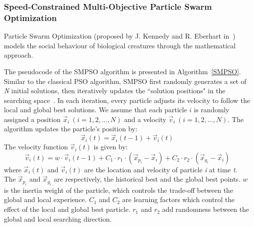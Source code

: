 \documentclass[10pt,journal,compsoc]{IEEEtran}
\begin{document}
\subsubsection{Speed-Constrained Multi-Objective Particle Swarm Optimization}
Particle Swarm Optimization (proposed by J. Kennedy and R. Eberhart in~\cite{poli2017}) models the social behaviour of biological creatures through the mathematical approach.

The pseudocode of the SMPSO algorithm is presented in Algorithm~\ref{SMPSO}. %
Similar to the classical PSO algorithm, SMPSO first randomly generates a set of \textit{N} initial solutions, then iteratively updates the ``solution positions" in the searching space~\cite{smpso}.
In each iteration, every particle adjusts its velocity to follow the local and global best solutions. We assume that each particle $i$ is randomly assigned a position $\vec{x}_i\ (i=1, 2, ..., N)$ and a velocity $\vec{v}_i\ (i=1,2,...,N)$. The algorithm updates the particle's position by:
\begin{equation}\label{psoposition}
\vec{x}_i(t) = \vec{x}_i(t-1) + \vec{v}_i(t)
\end{equation}
The velocity function $\vec{v}_i(t)$ is given by:
\begin{equation}\label{psospeed}
\vec{v}_i(t) = w \cdot \vec{v}_i(t-1) + C_1 \cdot r_1 \cdot (\vec{x}_{p_i}- \vec{x}_i)+ C_2 \cdot r_2 \cdot (\vec{x}_{g_i} - \vec{x}_i)
\end{equation}
where $\vec{x}_i(t)$ and $\vec{v}_i(t)$ are the location and velocity of particle \textit{i} at time \textit{t}. 
The $\vec{x}_{p_i}$ and $\vec{x}_{g_i}$ are respectively, the historical best and the global best points.
$w$ is the inertia weight of the particle, which controls the trade-off between the global and local experience.
$C_1$ and $C_2$ are learning factors which control the effect of the local and global best particle.
$r_1$ and $r_2 $ add randomness between the global and local searching direction.
\end{document}
